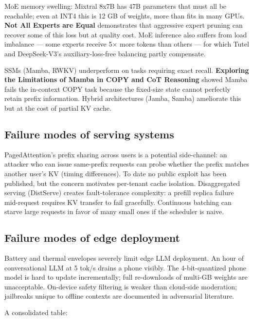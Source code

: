 \documentclass{article}
\begin{document}
MoE memory swelling: Mixtral 8x7B has 47B parameters that must all be reachable; even at INT4 this is 12 GB of weights, more than fits in many GPUs. \textbf{Not All Experts are Equal} \citep{lu20242024} demonstrates that aggressive expert pruning can recover some of this loss but at quality cost. MoE inference also suffers from load imbalance --- some experts receive 5× more tokens than others --- for which Tutel and DeepSeek-V3's auxiliary-loss-free balancing partly compensate.

SSMs (Mamba, RWKV) underperform on tasks requiring exact recall. \textbf{Exploring the Limitations of Mamba in COPY and CoT Reasoning} \citep{ren2024exploringthelimita} showed Mamba fails the in-context COPY task because the fixed-size state cannot perfectly retain prefix information. Hybrid architectures (Jamba, Samba) ameliorate this but at the cost of partial KV cache.

\subsection{Failure modes of serving systems}\label{failure-modes-of-serving-systems}

PagedAttention's prefix sharing across users is a potential side-channel: an attacker who can issue same-prefix requests can probe whether the prefix matches another user's KV (timing differences). To date no public exploit has been published, but the concern motivates per-tenant cache isolation. Disaggregated serving (DistServe) creates fault-tolerance complexity: a prefill replica failure mid-request requires KV transfer to fail gracefully. Continuous batching can starve large requests in favor of many small ones if the scheduler is naive.

\subsection{Failure modes of edge deployment}\label{failure-modes-of-edge-deployment}

Battery and thermal envelopes severely limit edge LLM deployment. An hour of conversational LLM at 5 tok/s drains a phone visibly. The 4-bit-quantized phone model is hard to update incrementally; full re-downloads of multi-GB weights are unacceptable. On-device safety filtering is weaker than cloud-side moderation; jailbreaks unique to offline contexts are documented in adversarial literature.

A consolidated table:
\end{document}
